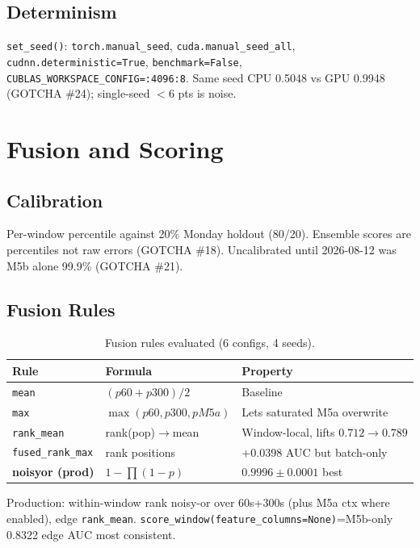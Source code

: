 \documentclass[12pt,a4paper,oneside]{report}
\newcommand{\bluetableheader}{\rowcolor{headerblue}\color{white}\bfseries}
\begin{document}
\subsection{Determinism}
\texttt{set\_seed()}: \texttt{torch.manual\_seed}, \texttt{cuda.manual\_seed\_all}, \texttt{cudnn.deterministic=True}, \texttt{benchmark=False}, \texttt{CUBLAS\_WORKSPACE\_CONFIG=:4096:8}. Same seed CPU 0.5048 vs GPU 0.9948 (GOTCHA \#24); single-seed $<$6 pts is noise.

\section{Fusion and Scoring}
\subsection{Calibration}
Per-window percentile against 20\% Monday holdout (80/20). Ensemble scores are percentiles not raw errors (GOTCHA \#18). Uncalibrated until 2026-08-12 was M5b alone 99.9\% (GOTCHA \#21).

\subsection{Fusion Rules}
\begin{table}[H]
\centering
\caption{Fusion rules evaluated (6 configs, 4 seeds).}
\label{tab:3.2}
\begin{tabular}{|L{3cm}|L{4.5cm}|L{6.8cm}|}
\hline
\bluetableheader Rule & Formula & Property \\ \hline
{} \texttt{mean} & $(p60+p300)/2$ & Baseline \\ \hline
\texttt{max} & $\max(p60,p300,pM5a)$ & Lets saturated M5a overwrite \\ \hline
{} \texttt{rank\_mean} & rank(pop)$\rightarrow$mean & Window-local, lifts $0.712\rightarrow0.789$ \\ \hline
\texttt{fused\_rank\_max} & rank positions & $+0.0398$ AUC but batch-only \\ \hline
{} \textbf{noisyor (prod)} & $1-\prod(1-p)$ & $0.9996\pm0.0001$ best \\ \hline
\end{tabular}
\end{table}

Production: within-window rank noisy-or over 60s+300s (plus M5a ctx where enabled), edge \texttt{rank\_mean}. \texttt{score\_window(feature\_columns=None)}=M5b-only 0.8322 edge AUC most consistent.
\end{document}
